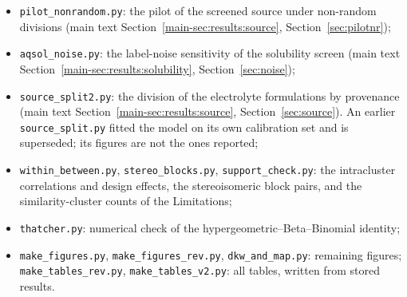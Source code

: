 \documentclass[10pt]{article}
\begin{document}
\begin{itemize}
\item \texttt{pilot\_nonrandom.py}: the pilot of the screened source under non-random divisions (main text Section~\ref{main-sec:results:source}, Section~\ref{sec:pilotnr});
\item \texttt{aqsol\_noise.py}: the label-noise sensitivity of the solubility screen (main text Section~\ref{main-sec:results:solubility}, Section~\ref{sec:noise});
\item \texttt{source\_split2.py}: the division of the electrolyte formulations by provenance (main text Section~\ref{main-sec:results:source}, Section~\ref{sec:source}). An earlier \texttt{source\_split.py} fitted the model on its own calibration set and is superseded; its figures are not the ones reported;
\item \texttt{within\_between.py}, \texttt{stereo\_blocks.py}, \texttt{support\_check.py}: the intracluster correlations and design effects, the stereoisomeric block pairs, and the similarity-cluster counts of the Limitations;
\item \texttt{thatcher.py}: numerical check of the hypergeometric--Beta--Binomial identity;
\item \texttt{make\_figures.py}, \texttt{make\_figures\_rev.py}, \texttt{dkw\_and\_map.py}: remaining figures; \texttt{make\_tables\_rev.py}, \texttt{make\_tables\_v2.py}: all tables, written from stored results.
\end{itemize}

\small


\end{document}

